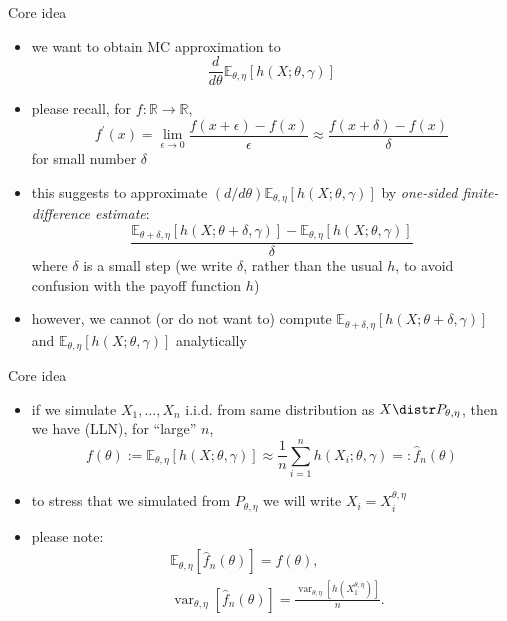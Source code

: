 \documentclass[pdf, handout]{beamer}
\begin{document}
\begin{frame}{Core idea}
\begin{itemize}
\item we want to obtain MC approximation to
$$
\frac{d}{d\theta} \mathbb{E}_{\theta,\eta} [ h(X; \theta, \gamma)]
$$
\item please recall, for $f:\mathbb{R}\to\mathbb{R}$,
\[
f^\prime(x) = \lim_{\epsilon\to 0} \frac{ f(x+\epsilon) - f(x)}{\epsilon}\approx \frac{ f(x+\delta) - f(x)}{\delta} %
\]
for small number $\delta$
\item this suggests to approximate
$(d/d\theta) \mathbb{E}_{\theta,\eta} [ h(X; \theta, \gamma)]$
by
\emph{one-sided finite-difference estimate}:
$$
\frac{ \mathbb{E}_{\theta+\delta,\eta} [ h(X; \theta+\delta, \gamma)]
-  \mathbb{E}_{\theta,\eta} [ h(X; \theta, \gamma)]
}{\delta}
$$
where $\delta$ is a small step (we write $\delta$, rather than the usual $h$, to avoid confusion with the payoff function $h$)
\item
however, we cannot (or do not want to) compute
$\mathbb{E}_{\theta+\delta,\eta} [ h(X; \theta+\delta, \gamma)]$ and
$\mathbb{E}_{\theta,\eta} [ h(X; \theta, \gamma)]$ analytically
\end{itemize}
\end{frame}

\begin{frame}{Core idea}
\begin{itemize}
\item if we simulate $X_1,\dots,X_n$ i.i.d. from same distribution as $X\distr P_{\theta,\eta}$, then we have (LLN), for ``large'' $n$,
\[
f(\theta):=\mathbb{E}_{\theta,\eta} [ h(X; \theta, \gamma)]
\approx \frac{1}{n}\sum_{i=1}^n h(X_i; \theta,\gamma)=:\hat f_n(\theta)
\]
\item to stress that we simulated from $ P_{\theta,\eta}$
we will write $X_i = X_i^{\theta,\eta}$
\item please note:
\begin{align*}
&\mathbb{E}_{\theta,\eta} [ \hat f_n(\theta) ] = f(\theta), \\
&\operatorname{var}_{\theta,\eta} [ \hat f_n(\theta) ] = 
\frac{ \operatorname{var}_{\theta,\eta}\left[ h\left(X_1^{\theta,\eta}\right)\right]}{n}.
\end{align*}
\end{itemize}
\end{frame}
\end{document}
